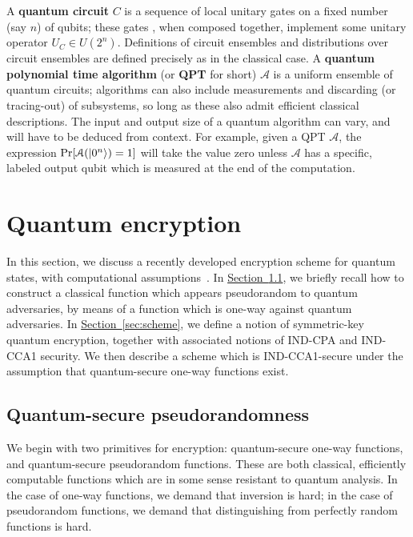 \documentclass[11pt]{article}
\numberwithin{equation}{section}
\newcommand{\expref}[2]{\texorpdfstring{\hyperref[#2]{#1~\ref{#2}}}{#1~\ref{#2}}}
\newcommand{\wf}[1]{{ \textcolor{orange}{(Bill:  #1)}}{}}
\begin{document}
{A \textbf{quantum circuit} $C$ is a sequence of local unitary gates on a fixed number (say $n$) of qubits; these gates , when composed together, implement some unitary operator $U_C \in U(2^n)$. Definitions of circuit ensembles and distributions over circuit ensembles are defined precisely as in the classical case. A \textbf{quantum polynomial time algorithm} (or \textbf{QPT} for short) $\mathcal A$ is a uniform ensemble of quantum circuits; algorithms can also include measurements and discarding (or tracing-out) of subsystems, so long as these also admit efficient classical descriptions. The input and output size of a quantum algorithm can vary, and will have to be deduced from context. For example, given a QPT $\mathcal A$, the expression $\Pr[\mathcal A({\left\vert{0^n}\right\rangle}) = 1]$ will take the value zero unless $\mathcal A$ has a specific, labeled output qubit which is measured at the end of the computation.

\section{Quantum encryption}\label{sec:encryption}

In this section, we discuss a recently developed encryption scheme for quantum states, with computational assumptions~\cite{ABFGSS16}. In \expref{Section}{sec:pseudo}, we briefly recall how to construct a classical function which appears pseudorandom to quantum adversaries, by means of a function which is one-way against quantum adversaries. In \expref{Section}{sec:scheme}, we define a notion of symmetric-key quantum encryption, together with associated notions of IND-CPA and IND-CCA1 security. We then describe a scheme which is IND-CCA1-secure under the assumption that quantum-secure one-way functions exist. 

\subsection{Quantum-secure pseudorandomness}\label{sec:pseudo}

We begin with two primitives for encryption: quantum-secure one-way functions, and quantum-secure pseudorandom functions. These are both classical, efficiently computable functions which are in some sense resistant to quantum analysis. In the case of one-way functions, we demand that inversion is hard; in the case of pseudorandom functions, we demand that distinguishing from perfectly random functions is hard.

}
\end{document}
